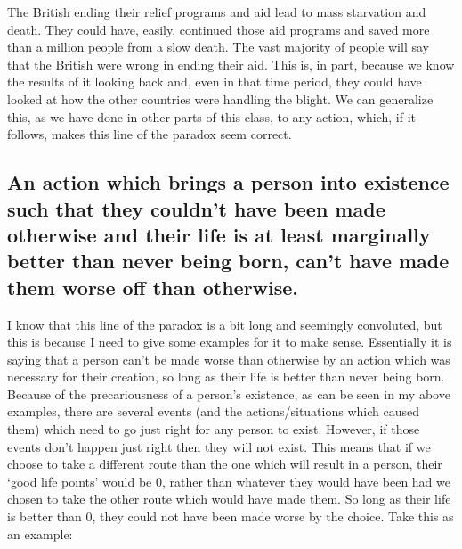 The British ending their relief programs and aid lead to mass starvation and death. They could have, easily, continued those aid programs and saved more than a million people from a slow death. The vast majority of people will say that the British were wrong in ending their aid. This is, in part, because we know the results of it looking back and, even in that time period, they could have looked at how the other countries were handling the blight. We can generalize this, as we have done in other parts of this class, to any action, which, if it follows, makes this line of the paradox seem correct. 
\subsection{An action which brings a person into existence such that they couldn’t have been made otherwise and their life is at least marginally better than never being born, can’t have made them worse off than otherwise.}

I know that this line of the paradox is a bit long and seemingly convoluted, but this is because I need to give some examples for it to make sense. Essentially it is saying that a person can't be made worse than otherwise by an action which was necessary for their creation, so long as their life is better than never being born. Because of the precariousness of a person's existence, as can be seen in my above examples, there are several events (and the actions/situations which caused them) which need to go just right for any person to exist. However, if those events don't happen just right then they will not exist. This means that if we choose to take a different route than the one which will result in a person, their `good life points' would be 0, rather than whatever they would have been had we chosen to take the other route which would have made them. So long as their life is better than 0, they could not have been made worse by the choice. Take this as an example:


